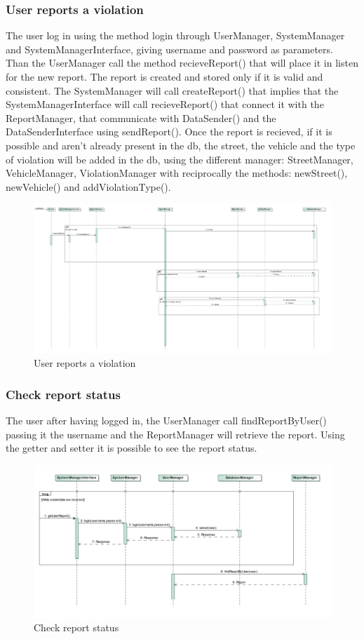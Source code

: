 \subsubsection{User reports a violation}
The user log in using the method login through UserManager, SystemManager and SystemManagerInterface, giving username and password as parameters.
Than the UserManager call the method recieveReport() that will place it in listen for the new report. The report is created and stored only if it is valid and consistent. The SystemManager will call createReport() that implies that the SystemManagerInterface will call recieveReport() that connect it with the ReportManager, that communicate with DataSender() and the DataSenderInterface using sendReport().
Once the report is recieved, if it is possible and aren't already present in the db, the street, the vehicle and the type of violation will be added in the db, using the different manager: StreetManager, VehicleManager, ViolationManager with reciprocally the methods: newStreet(), newVehicle() and addViolationType().
\begin{figure} 
	\centering
	\includegraphics[width=0.95\linewidth, height=0.7\textheight]{Images/RunTimeDiagram/Sequence2}
	\caption{User reports a violation}
	\label{fig:User reports a violation}
\end{figure}
\subsubsection{Check report status}
The user after having logged in, the UserManager call findReportByUser() passing it the username and the ReportManager will retrieve the report. Using the getter and setter it is possible to see the report status.
\begin{figure}
	\centering
	\includegraphics[width=0.95\linewidth, height=0.4\textheight]{Images/RunTimeDiagram/Sequence3}
	\caption{Check report status}
	\label{fig:Check report status}
\end{figure}
